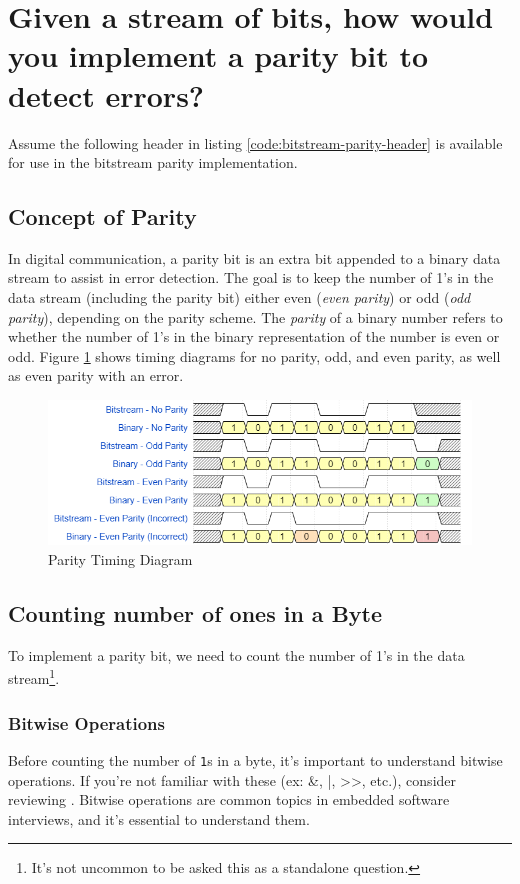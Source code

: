 \documentclass[main.tex]{subfiles}
\begin{document}
\section{Given a stream of bits, how would you implement a parity bit to detect errors?}
Assume the following header in listing \ref{code:bitstream-parity-header} is available for use in the bitstream parity implementation. 



\spoilerline
\subsection{Concept of Parity}
In digital communication, a parity bit is an extra bit appended to a binary data stream to assist in error detection. The goal is to keep the number of 1's in the data stream (including the parity bit) either even (\textit{even parity}) or odd (\textit{odd parity}), depending on the parity scheme. The \textit{parity} of a binary number refers to whether the number of 1's in the binary representation of the number is even or odd. Figure \ref{fig:parity-timing-dagiram} shows timing diagrams for no parity, odd, and even parity, as well as even parity with an error. 

\begin{figure}[H]
    \centering
    \includegraphics[scale=0.5]{images/parity.png}
    \caption{Parity Timing Diagram}
    \label{fig:parity-timing-dagiram}
\end{figure}

\subsection {Counting number of ones in a Byte}
To implement a parity bit, we need to count the number of 1's in the data stream\footnote{It's not uncommon to be asked this as a standalone question.}. 
\subsubsection{Bitwise Operations}
Before counting the number of \texttt{1}s in a byte, it’s important to understand bitwise operations. If you’re not familiar with these (ex: \&, |, >>, etc.), consider reviewing . Bitwise operations are common topics in embedded software interviews, and it's essential to understand them.
\end{document}
